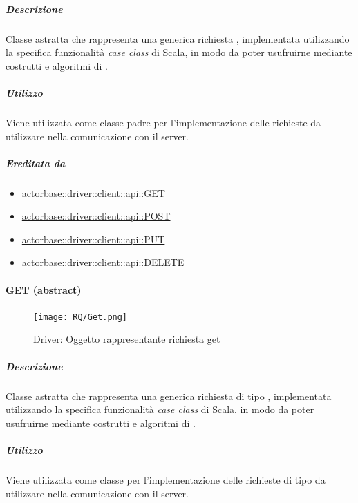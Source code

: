 \documentclass{scalatekids-article}
\begin{document}
\subparagraph{Descrizione}

Classe astratta che rappresenta una generica richiesta ,
implementata utilizzando la specifica funzionalità \textit{case class} di Scala,
in modo da poter usufruirne mediante costrutti e algoritmi di .

\subparagraph{Utilizzo}

Viene utilizzata come classe padre per l'implementazione delle richieste
 da utilizzare nella comunicazione con il server.

\subparagraph{Ereditata da}

\begin{itemize}
\item \hyperref[sec:actorbase::driver::client::api::GET]{actorbase::driver::client::api::GET}
\item \hyperref[sec:actorbase::driver::client::api::POST]{actorbase::driver::client::api::POST}
\item \hyperref[sec:actorbase::driver::client::api::PUT]{actorbase::driver::client::api::PUT}
\item \hyperref[sec:actorbase::driver::client::api::DELETE]{actorbase::driver::client::api::DELETE}
\end{itemize}


\paragraph{GET (abstract)}
\label{sec:actorbase::driver::client::api::GET}

\begin{figure}[H]
  \begin{center}
    \texttt{[image: RQ/Get.png]}
    \caption{Driver: Oggetto rappresentante richiesta get}
  \end{center}
\end{figure}

\subparagraph{Descrizione}

Classe astratta che rappresenta una generica richiesta  di tipo
, implementata utilizzando la specifica funzionalità \textit{case
  class} di Scala, in modo da poter usufruirne mediante costrutti e algoritmi di
.

\subparagraph{Utilizzo}

Viene utilizzata come classe per l'implementazione delle richieste 
di tipo  da utilizzare nella comunicazione con il server.
\end{document}
